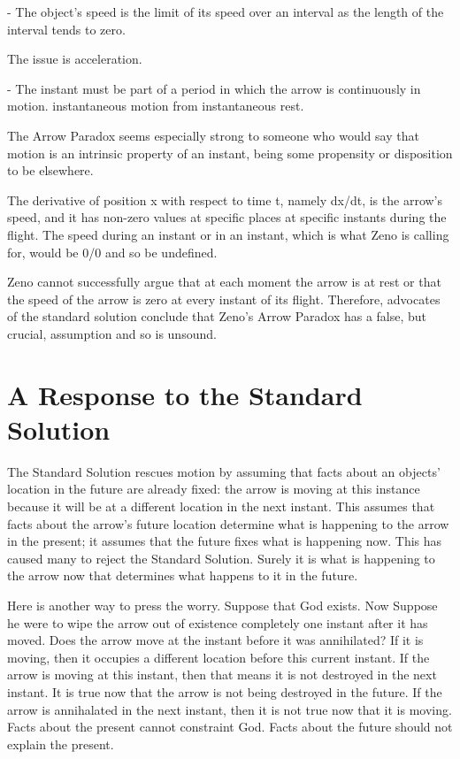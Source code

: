 \documentclass[oneside]{article}
\begin{document}
- The object's speed is the limit of its speed over an interval as the length of the interval tends to zero.


The issue is acceleration.

- The instant must be part of a period in which the arrow is continuously
in motion. instantaneous motion from instantaneous rest.

The Arrow Paradox seems especially strong to someone who would say that motion is an intrinsic property of an instant, being some propensity or disposition to be elsewhere.


The derivative of position x with respect to time t, namely dx/dt, is the arrow's speed, and it has non-zero values at specific places at specific instants during the flight. The speed during an instant or in an instant, which is what Zeno is calling for, would be 0/0 and so be undefined.

Zeno cannot successfully argue that at each moment the arrow is at rest or that the speed of the arrow is zero at every instant of its flight. Therefore, advocates of the standard solution conclude that Zeno's Arrow Paradox has a false, but crucial, assumption and so is unsound.

\section{A Response to the Standard Solution}

The Standard Solution rescues motion by assuming that facts
  about an objects' location in the future are already fixed: the arrow is moving at this instance because it will be at a different location in the next instant. This assumes that facts about the arrow's future location determine what is happening to the arrow in the present; it assumes that the future fixes what is happening now. This has caused many to reject the Standard Solution. Surely it is what is happening to the arrow now that determines what happens to it in the future.  

Here is another way to press the worry. Suppose that God exists. Now Suppose he were to wipe the arrow out of existence completely one instant after it has moved. Does the arrow move at the instant before it was annihilated? If it is moving, then it occupies a different location before this current instant.  If the arrow is moving at this instant, then that means it is not  destroyed in the next instant. It is true now that the arrow is not
  being destroyed in the future. If the arrow is annihalated in the next instant, then it is not true now that it is moving. Facts about the present cannot constraint God. Facts about the future should not explain the present. 
\end{document}
